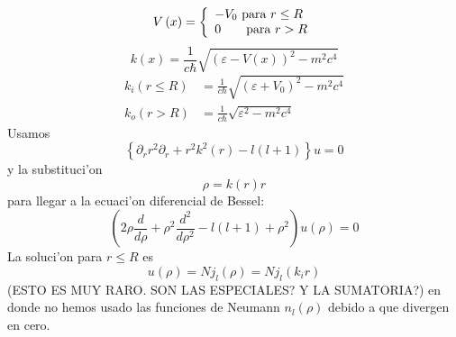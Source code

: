 \begin{equation}
V\left(  x\right)  =\left\{
\begin{array}
[c]{l}%
-V_{0}\text{ para }r\leq R\\
0\text{ \ \ \ \ \ para }r>R
\end{array}
\right.
\end{equation}
\begin{equation}
k\left(  x\right)  =\frac{1}{c\hbar}\sqrt{\left(  \varepsilon-V\left(
x\right)  \right)  ^{2}-m^{2}c^{4}}%
\end{equation}
\begin{align*}
k_{i}\left(  r\leq R\right)   & =\frac{1}{c\hbar}\sqrt{\left(  \varepsilon
+V_{0}\right)  ^{2}-m^{2}c^{4}}\\
k_{o}\left(  r>R\right)   & =\frac{1}{c\hbar}\sqrt{\varepsilon^{2}-m%
^{2}c^{4}}%
\end{align*}
Usamos
\begin{equation}
\left\{  \partial_{r}r^{2}\partial_{r}+r^{2}k^{2}\left(  r\right)  -l\left(
l+1\right)  \right\}  u=0
\end{equation}
y la substituci'on
\begin{equation}
\rho=k\left(  r\right)  r
\end{equation}
para llegar a la ecuaci'on diferencial de Bessel:
\begin{equation}
\left(  2\rho\frac{d}{d\rho}+\rho^{2}\frac{d^{2}}{d\rho^{2}}-l\left(
l+1\right)  +\rho^{2}\right)  u\left(  \rho\right)  =0
\end{equation}
La soluci'on para $r\leq R$ es
\begin{equation}
u\left(  \rho\right)  =Nj_{l}\left(  \rho\right)  =Nj_{l}\left(
k_{i}r\right)
\end{equation}
(ESTO ES MUY RARO. \textquestiondown SON LAS ESPECIALES? \textquestiondown Y
LA SUMATORIA?) en donde no hemos usado las funciones de Neumann $n_{l}(\rho)$ debido a que divergen en cero.

